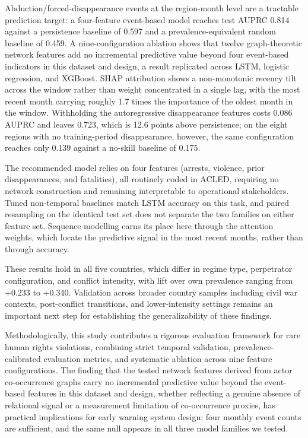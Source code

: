 \documentclass[pdflatex,sn-mathphys-num]{sn-jnl}%
\theoremstyle{thmstyleone}%
\theoremstyle{thmstyletwo}%
\theoremstyle{thmstylethree}%
\begin{document}
Abduction/forced-disappearance events at the region-month level are a tractable prediction target: a four-feature event-based model reaches test AUPRC 0.814 against a persistence baseline of 0.597 and a prevalence-equivalent random baseline of 0.459. A nine-configuration ablation shows that twelve graph-theoretic network features add no incremental predictive value beyond four event-based indicators in this dataset and design, a result replicated across LSTM, logistic regression, and XGBoost. SHAP attribution shows a non-monotonic recency tilt across the window rather than weight concentrated in a single lag, with the most recent month carrying roughly 1.7 times the importance of the oldest month in the window. Withholding the autoregressive disappearance features costs 0.086 AUPRC and leaves 0.723, which is 12.6 points above persistence; on the eight regions with no training-period disappearance, however, the same configuration reaches only 0.139 against a no-skill baseline of 0.175.

The recommended model relies on four features (arrests, violence, prior disappearances, and fatalities), all routinely coded in ACLED, requiring no network construction and remaining interpretable to operational stakeholders. Tuned non-temporal baselines match LSTM accuracy on this task, and paired resampling on the identical test set does not separate the two families on either feature set. Sequence modelling earns its place here through the attention weights, which locate the predictive signal in the most recent months, rather than through accuracy.

These results hold in all five countries, which differ in regime type, perpetrator configuration, and conflict intensity, with lift over own prevalence ranging from $+0.233$ to $+0.340$. Validation across broader country samples including civil war contexts, post-conflict transitions, and 
lower-intensity settings remains an important next step for establishing the generalizability of these findings.

Methodologically, this study contributes a rigorous evaluation framework for rare human rights violations, combining strict temporal validation, prevalence-calibrated evaluation metrics, and systematic ablation across nine feature configurations. The finding that the tested network features derived from actor co-occurrence graphs carry no incremental predictive value beyond the event-based features in this dataset and design, whether reflecting a genuine absence of relational signal or a measurement limitation of co-occurrence proxies, has practical implications for early warning system design: four monthly event counts are sufficient, and the same null appears in all three model families we tested.
\end{document}
